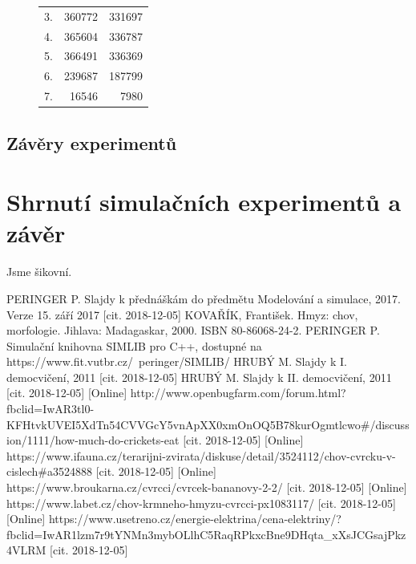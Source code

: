 \documentclass[11pt, a4paper, titlepage]{article}
\begin{document}
\begin{figure}[H]
\begin{minipage}{.5\textwidth}
\begin{center}
\begin{table}[H]
\begin{tabular}{|r|r|r|}
                        3. & 360772 & 331697 \\
                        4. & 365604 & 336787 \\
                        5. & 366491 & 336369 \\
                        6. & 239687 & 187799 \\
                        7. & 16546 & 7980 \\
                        \hline
                    \end{tabular}
                \end{table}
            \end{center}
        \end{minipage}
    \end{figure}

    \subsection{Závěry experimentů}

    \section{Shrnutí simulačních experimentů a závěr}
    Jsme šikovní.

    \begin{thebibliography}{zdroje}
         \label{ims} PERINGER P. Slajdy k přednáškám do předmětu Modelování a simulace, 2017. Verze 15. září 2017 [cit. 2018-12-05]
         \label{kniha} KOVAŘÍK, František. Hmyz: chov, morfologie. Jihlava: Madagaskar, 2000. ISBN 80-86068-24-2.
         \label{simlib} PERINGER P. Simulační knihovna SIMLIB pro C++, dostupné na https://www.fit.vutbr.cz/~peringer/SIMLIB/
         \label{prvnidemo} HRUBÝ M. Slajdy k I. democvičení, 2011 [cit. 2018-12-05]
         \label{druhedemo} HRUBÝ M. Slajdy k II. democvičení, 2011 [cit. 2018-12-05]
         \label{jidlo} [Online] http://www.openbugfarm.com/forum.html?fbclid=IwAR3tl0-KFHtvkUVEI5XdTn54CVVGcY5vnApXX0xmOnOQ5B78kurOgmtlcwo\#/discussion/1111/how-much-do-crickets-eat [cit. 2018-12-05]
         \label{forum} [Online] https://www.ifauna.cz/terarijni-zvirata/diskuse/detail/3524112/chov-cvrcku-v-cislech\#a3524888 [cit. 2018-12-05]
         \label{cena} [Online] https://www.broukarna.cz/cvrcci/cvrcek-bananovy-2-2/ [cit. 2018-12-05]
         \label{topeni} [Online] https://www.labet.cz/chov-krmneho-hmyzu-cvrcci-px1083117/ [cit. 2018-12-05]
         \label{cena_topeni} [Online] https://www.usetreno.cz/energie-elektrina/cena-elektriny/?fbclid=IwAR1lzm7r9tYNMn3mybOLlhC5RaqRPkxcBne9DHqta_xXsJCGsajPkz4VLRM [cit. 2018-12-05]
    \end{thebibliography}
\end{document}
